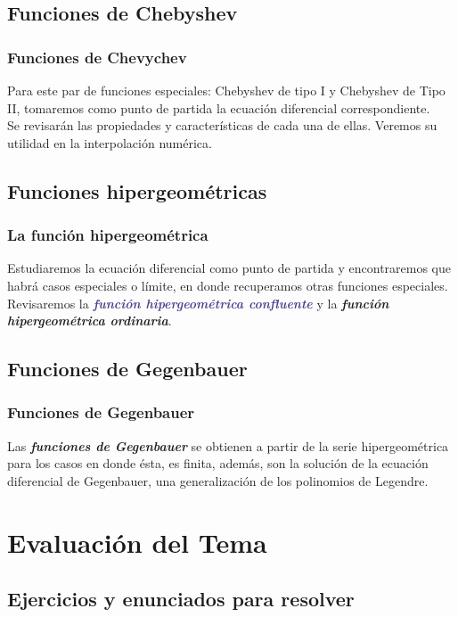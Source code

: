 \documentclass[12pt]{beamer}
\begin{document}
\subsection{Funciones de Chebyshev}

\begin{frame}
\frametitle{Funciones de Chevychev}
Para este par de funciones especiales: Chebyshev de tipo I y Chebyshev de Tipo II, tomaremos como punto de partida la ecuación diferencial correspondiente.
\\
\bigskip
\pause
Se revisarán las propiedades y características de cada una de ellas. Veremos su utilidad en la interpolación numérica.
\end{frame}

\subsection{Funciones hipergeométricas}

\begin{frame}
\frametitle{La función hipergeométrica}
Estudiaremos la ecuación diferencial como punto de partida y encontraremos que habrá casos especiales o límite, en donde recuperamos otras funciones especiales.
\\
\bigskip
Revisaremos la \emph{\textbf{\textcolor{darkslateblue}{función hipergeométrica confluente}}} \pause y la \emph{\textbf{\textcolor{denim}{función hipergeométrica ordinaria}}}.
\end{frame}

\subsection{Funciones de Gegenbauer}

\begin{frame}
\frametitle{Funciones de Gegenbauer}
Las \emph{\textbf{\textcolor{flame}{funciones de Gegenbauer}}} se obtienen a partir de la serie hipergeométrica para los casos en donde ésta, es finita, \pause además, son la solución de la ecuación diferencial de Gegenbauer, una generalización de los polinomios de Legendre.
\end{frame}

\section{Evaluación del Tema}
\subsection{Ejercicios y enunciados para resolver}
\end{document}
